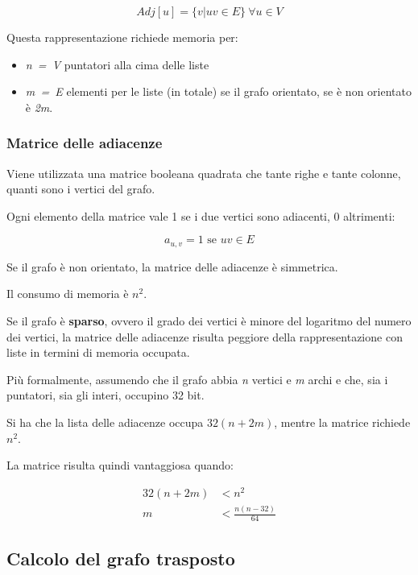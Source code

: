 $$
Adj[u] = \{v | uv \in E\} \: \forall u \in V 
$$

Questa rappresentazione richiede memoria per:

\begin{itemize}
\tightlist
\item
  \textit{n\ =\ \textbar{}V\textbar{}} puntatori alla cima delle liste
\item
  \textit{m\ =\ \textbar{}E\textbar{}} elementi per le liste (in totale)
  se il grafo orientato, se è non orientato è \textit{2m}.
\end{itemize}

\subsubsection{Matrice delle adiacenze}\label{matrice-delle-adiacenze}

Viene utilizzata una matrice booleana quadrata che tante righe e tante
colonne, quanti sono i vertici del grafo.

Ogni elemento della matrice vale 1 se i due vertici sono adiacenti, 0
altrimenti:

$$
a_{u,v} = 1 \text{ se } uv \in E
$$

Se il grafo è non orientato, la matrice delle adiacenze è simmetrica.

Il consumo di memoria è $n^2$.

Se il grafo è \textbf{sparso}, ovvero il grado dei vertici è minore del
logaritmo del numero dei vertici, la matrice delle adiacenze risulta
peggiore della rappresentazione con liste in termini di memoria
occupata.

Più formalmente, assumendo che il grafo abbia \textit{n} vertici e \textit{m} archi e che, sia i puntatori, sia gli interi, occupino 32 bit.

Si ha che la lista delle adiacenze occupa $32(n+2m)$, mentre la matrice richiede $n^2$.

La matrice risulta quindi vantaggiosa quando:

\begin{align*}
	32(n+2m) &< n^2 \\
	m &< \frac{n(n-32)}{64}
\end{align*}


\subsection{Calcolo del grafo trasposto}\label{calcolo-del-grafo-trasposto}

